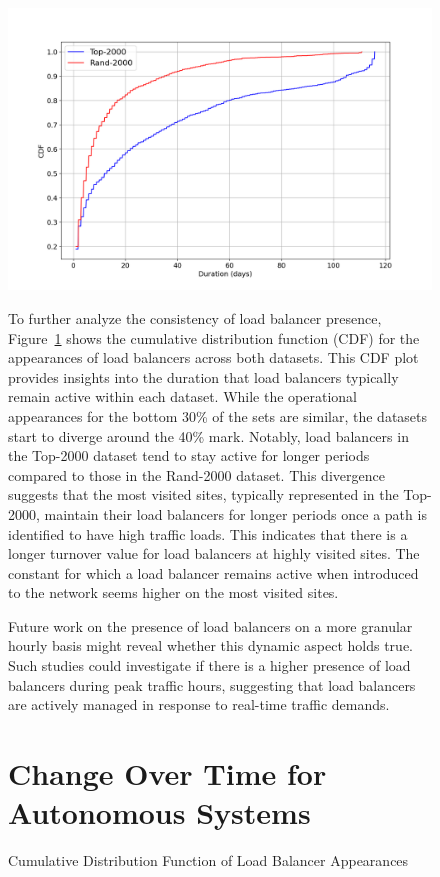 \documentclass[12pt]{cwru_thesis}
\begin{document}
\begin{figure}[h!]
    \centering
    \includegraphics[width=\linewidth]{figures/cdf_load_balancer_durations_comparison.png}
    \caption{Cumulative Distribution Function of Load Balancer Appearances}
    \label{fig:cdf_durations}
\endfigure

To further analyze the consistency of load balancer presence, Figure~\ref{fig:cdf_durations} shows the cumulative distribution function (CDF) for the appearances of load balancers across both datasets. This CDF plot provides insights into the duration that load balancers typically remain active within each dataset. While the operational appearances for the bottom 30\% of the sets are similar, the datasets start to diverge around the 40\% mark. Notably, load balancers in the Top-2000 dataset tend to stay active for longer periods compared to those in the Rand-2000 dataset. This divergence suggests that the most visited sites, typically represented in the Top-2000, maintain their load balancers for longer periods once a path is identified to have high traffic loads. This indicates that there is a longer turnover value for load balancers at highly visited sites. The constant for which a load balancer remains active when introduced to the network seems higher on the most visited sites.

Future work on the presence of load balancers on a more granular hourly basis might reveal whether this dynamic aspect holds true. Such studies could investigate if there is a higher presence of load balancers during peak traffic hours, suggesting that load balancers are actively managed in response to real-time traffic demands.


\section{Change Over Time for Autonomous Systems}


\end{figure}
\end{document}
